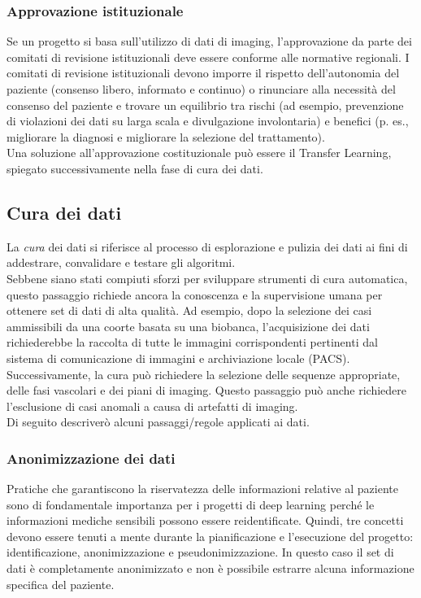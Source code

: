 \documentclass[12pt,a4paper]{report}
\begin{document}
\subsubsection{Approvazione istituzionale}
Se un progetto si basa sull’utilizzo di dati di imaging, l'approvazione da parte dei comitati di revisione istituzionali deve essere conforme alle normative regionali. I comitati di revisione istituzionali devono imporre il rispetto dell'autonomia del paziente (consenso libero, informato e continuo) o rinunciare alla necessità del consenso del paziente e trovare un equilibrio tra rischi (ad esempio, prevenzione di violazioni dei dati su larga scala e divulgazione involontaria) e benefici (p. es., migliorare la diagnosi e migliorare la selezione del trattamento).\\
Una soluzione all'approvazione costituzionale può essere il Transfer Learning, spiegato successivamente nella fase di cura dei dati.

\subsection{Cura dei dati}
La \emph{cura} dei dati si riferisce al processo di esplorazione e pulizia dei dati ai fini di addestrare, convalidare e testare gli algoritmi. \\
Sebbene siano stati compiuti sforzi per sviluppare strumenti di cura automatica, questo passaggio richiede ancora la conoscenza e la supervisione umana per ottenere set di dati di alta qualità.
Ad esempio, dopo la selezione dei casi ammissibili da una coorte basata su una biobanca, l'acquisizione dei dati richiederebbe la raccolta di tutte le immagini corrispondenti pertinenti dal sistema di comunicazione di immagini e archiviazione locale (PACS). Successivamente, la cura può richiedere la selezione delle sequenze appropriate, delle fasi vascolari e dei piani di imaging. Questo passaggio può anche richiedere l'esclusione di casi anomali a causa di artefatti di imaging.\\
Di seguito descriverò alcuni passaggi/regole applicati ai dati.

\subsubsection{Anonimizzazione dei dati}
Pratiche che garantiscono la riservatezza delle informazioni relative al paziente sono di fondamentale importanza per i progetti di deep learning perché le informazioni mediche sensibili possono essere reidentificate. Quindi, tre concetti devono essere tenuti a mente durante la pianificazione e l'esecuzione del progetto: identificazione, anonimizzazione e pseudonimizzazione.
In questo caso il set di dati è completamente anonimizzato e non è possibile estrarre alcuna informazione specifica del paziente. 
\end{document}
